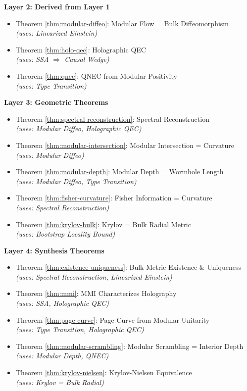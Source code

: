 \documentclass[12pt,a4paper]{article}
\begin{document}
\textbf{Layer 2: Derived from Layer 1}
\begin{itemize}
    \item Theorem \ref{thm:modular-diffeo}: Modular Flow = Bulk Diffeomorphism \\
    \textit{(uses: Linearized Einstein)}
    \item Theorem \ref{thm:holo-qec}: Holographic QEC \\
    \textit{(uses: SSA $\Rightarrow$ Causal Wedge)}
    \item Theorem \ref{thm:qnec}: QNEC from Modular Positivity \\
    \textit{(uses: Type Transition)}
\end{itemize}

\textbf{Layer 3: Geometric Theorems}
\begin{itemize}
    \item Theorem \ref{thm:spectral-reconstruction}: Spectral Reconstruction \\
    \textit{(uses: Modular Diffeo, Holographic QEC)}
    \item Theorem \ref{thm:modular-intersection}: Modular Intersection = Curvature \\
    \textit{(uses: Modular Diffeo)}
    \item Theorem \ref{thm:modular-depth}: Modular Depth = Wormhole Length \\
    \textit{(uses: Modular Diffeo, Type Transition)}
    \item Theorem \ref{thm:fisher-curvature}: Fisher Information = Curvature \\
    \textit{(uses: Spectral Reconstruction)}
    \item Theorem \ref{thm:krylov-bulk}: Krylov = Bulk Radial Metric \\
    \textit{(uses: Bootstrap Locality Bound)}
\end{itemize}

\textbf{Layer 4: Synthesis Theorems}
\begin{itemize}
    \item Theorem \ref{thm:existence-uniqueness}: Bulk Metric Existence \& Uniqueness \\
    \textit{(uses: Spectral Reconstruction, Linearized Einstein)}
    \item Theorem \ref{thm:mmi}: MMI Characterizes Holography \\
    \textit{(uses: SSA, Holographic QEC)}
    \item Theorem \ref{thm:page-curve}: Page Curve from Modular Unitarity \\
    \textit{(uses: Type Transition, Holographic QEC)}
    \item Theorem \ref{thm:modular-scrambling}: Modular Scrambling = Interior Depth \\
    \textit{(uses: Modular Depth, QNEC)}
    \item Theorem \ref{thm:krylov-nielsen}: Krylov-Nielsen Equivalence \\
    \textit{(uses: Krylov = Bulk Radial)}
\end{itemize}
\end{document}
